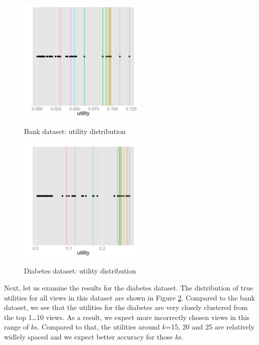 \begin{figure}[h]
\centering
{\includegraphics[trim = 0mm 50mm 0mm 50mm, clip, width=6cm]
{Images/bank_utility_distribution.pdf}}
\caption{Bank dataset: utility distribution}
\label{fig:bank_utility_distribution}
\end{figure}
\begin{figure}[h]
\centering
{\includegraphics[trim = 0mm 50mm 0mm 50mm, clip, width=6cm]
{Images/diabetes_utility_distribution.pdf}}
\caption{Diabetes dataset: utility distribution}
\label{fig:diabetes_utility_distribution}
\end{figure}
 
Next, let us examine the results for the diabetes dataset.
The distribution of true utilities for all views in this dataset are shown in
Figure \ref{fig:diabetes_utility_distribution}.
Compared to the bank dataset, we see that the utilities for the diabetes are
very closely clustered from the top 1\ldots10 views. 
As a result, we expect more incorrectly chosen views in this range of $k$s.
Compared to that, the utilities around $k$=15, 20 and 25 are relatively widlely
spaced and we expect better accuracy for those $k$s.


